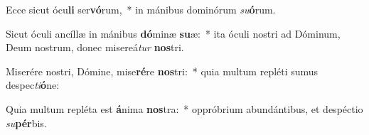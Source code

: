 \item Ecce sicut ócu\textbf{li} ser\textbf{vó}rum,~* in mánibus dominórum \textit{su}\textbf{ó}rum.
\item Sicut óculi ancíllæ in mánibus \textbf{dó}minæ \textbf{su}æ:~* ita óculi nostri ad Dóminum, Deum nostrum, donec misereá\textit{tur} \textbf{nos}tri.
\item Miserére nostri, Dómine, mise\textbf{ré}re \textbf{nos}tri:~* quia multum repléti sumus despec\textit{ti}\textbf{ó}ne:
\item Quia multum repléta est \textbf{á}nima \textbf{nos}tra:~* oppróbrium abundántibus, et despéctio \textit{su}\textbf{pér}bis.

